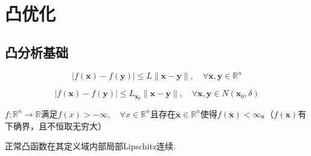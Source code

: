 \section{凸优化}
\subsection{凸分析基础}
\begin{definition}[Lipschitz连续]
    \[
        \lvert f(\boldsymbol{x})-f(\boldsymbol{y})\rvert\leqslant L\lVert\boldsymbol{x}-\boldsymbol{y}\rVert,\quad\forall\boldsymbol{x},\boldsymbol{y}\in\mathbb{R}^n   
    \]
\end{definition}
\begin{definition}[局部Lipschitz连续]
    \[
        |f(\boldsymbol{x})-f(\boldsymbol{y})|\leqslant L_{\boldsymbol{x}_0}\|\boldsymbol{x}-\boldsymbol{y}\|,\quad\forall\boldsymbol{x},\boldsymbol{y}\in N(\boldsymbol{x}_0,\delta)
    \]
\end{definition}
\begin{definition}[正常函数]
    $f:\mathbb{R}^n\to\mathbb{R}$满足$f(x)>-\infty,\quad\forall x\in\mathbb{R}^n$且存在$\bar{\boldsymbol{x}}\in\mathbb{R}^n$使得$f(\boldsymbol{\bar{x}})<\infty$。\colorbox{red!50}{（$f(\boldsymbol{x})$有下确界，且不恒取无穷大）}
\end{definition}
\begin{theorem}
    正常凸函数在其定义域内部局部Lipschitz连续.
\end{theorem}
